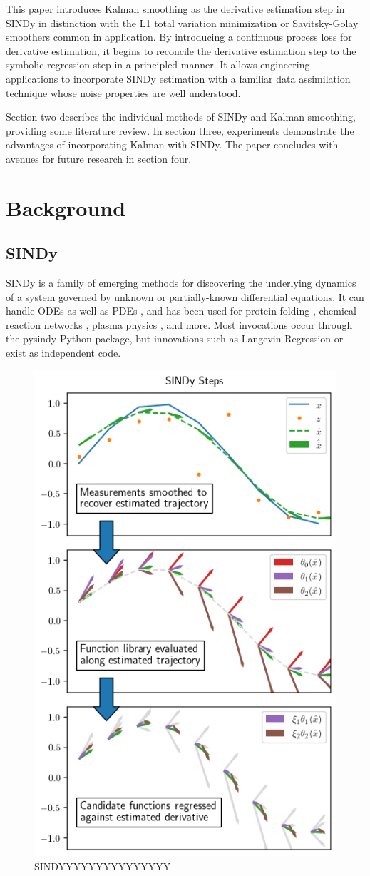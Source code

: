 \documentclass{article}
\begin{document}
This paper introduces Kalman smoothing as the derivative estimation step in SINDy in distinction with the L1 total variation minimization or Savitsky-Golay smoothers common in application.
By introducing a continuous process loss for derivative estimation, it begins to reconcile the derivative estimation step to the symbolic regression step in a principled manner.
It allows engineering applications to incorporate SINDy estimation with a familiar data assimilation technique whose noise properties are well understood.

Section two describes the individual methods of SINDy and Kalman smoothing, providing some literature review.  In section three, experiments demonstrate the advantages of incorporating Kalman with SINDy.  The paper concludes with avenues for future research in section four.

\section{Background}

\subsection{SINDy}
SINDy \cite{Brunton2016} is a family of emerging methods for discovering the underlying dynamics of a system governed by unknown or partially-known \cite{Champion2020} differential equations.  It can handle ODEs as well as PDEs \cite{Rudy2017}, and has been used for protein folding \cite{Boninsegna2018}, chemical reaction networks \cite{Hoffmann2019}, plasma physics \cite{Guan2021}, and more.  Most invocations occur through the pysindy Python package, but innovations such as Langevin Regression \cite{Callaham2021} or \cite{Rudy2019} exist as independent code.

\begin{figure}[ht]
    \label{fig:sindy}
    \centering
    \includegraphics[width=.5\textwidth]{images/explain_sindy}
    \caption{SINDYYYYYYYYYYYYYYY}
\end{figure}
\end{document}
